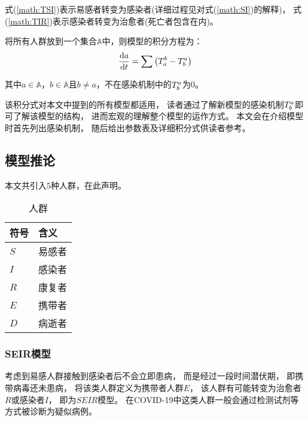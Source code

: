 \par 式(\ref{math:TSI})表示易感者转变为感染者(详细过程见对式(\ref{math:SI})的解释)，
式(\ref{math:TIR})表示感染者转变为治愈者(死亡者包含在内)。
\par 将所有人群放到一个集合$\mathbb{A}$中，则模型的积分方程为：
\begin{equation}
    \frac{\mathrm{d}a}{\mathrm{d}t} = \sum\left(T^{b}_{a}-T^{a}_{b}\right)
\end{equation}
\par 其中$a\in\mathbb{A}$，$b\in\mathbb{A}$且$b\not=a$，不在感染机制中的$T^{a}_{b}$为$0$。
\par 该积分式对本文中提到的所有模型都适用，
读者通过了解新模型的感染机制$T^{a}_{b}$即可了解该模型的结构，
进而宏观的理解整个模型的运作方式。
本文会在介绍模型时首先列出感染机制，
随后给出参数表及详细积分式供读者参考。
\subsection{模型推论}
\par 本文共引入$5$种人群，在此声明。
\begin{table}[H]
    \centering
    \caption{人群}
    \begin{tabular}{ll}
        \hline
        符号 & 含义   \\
        \hline
        $S$  & 易感者 \\
        $I$  & 感染者 \\
        $R$  & 康复者 \\
        $E$  & 携带者 \\
        $D$  & 病逝者 \\
        \hline
    \end{tabular}
\end{table}
\subsubsection{SEIR模型}
\par 考虑到易感人群接触到感染者后不会立即患病，
而是经过一段时间潜伏期，
即携带病毒还未患病，
将该类人群定义为携带者人群$E$，
该人群有可能转变为治愈者$R$或感染者$I$，
即为$SEIR$模型。
在COVID-19中这类人群一般会通过检测试剂等方式被诊断为疑似病例。
